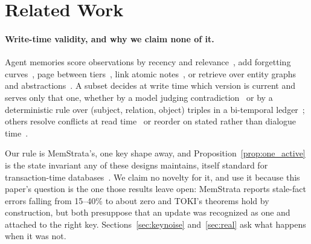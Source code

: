 \documentclass{article} %
\begin{document}
\section{Related Work}

\paragraph{Write-time validity, and why we claim none of it.}\label{sec:related_validity}
Agent memories score observations by recency and relevance~\citep{park2023generative}, add forgetting curves~\citep{zhong2024memorybank}, page between tiers~\citep{packer2023memgpt}, link atomic notes~\citep{xu2025amem}, or retrieve over entity graphs and abstractions~\citep{gutierrez2024hipporag,xia2026memora}. A subset decides at write time which version is current and serves only that one, whether by a model judging contradiction~\citep{rasmussen2025zep,chhikara2025mem0} or by a deterministic rule over (subject, relation, object) triples in a bi-temporal ledger~\citep{yadav2026memstrata,wang2026toki}; others resolve conflicts at read time~\citep{banerjee2026apex} or reorder on stated rather than dialogue time~\citep{su2026beyond}.

Our rule is MemStrata's, one key shape away, and Proposition~\ref{prop:one_active} is the state invariant any of these designs maintains, itself standard for transaction-time databases~\citep{jensen1999temporal}. We claim no novelty for it, and use it because this paper's question is the one those results leave open: MemStrata reports stale-fact errors falling from 15--40\% to about zero and TOKI's theorems hold by construction, but both presuppose that an update was recognized as one and attached to the right key. Sections~\ref{sec:keynoise} and~\ref{sec:real} ask what happens when it was not.
\end{document}
